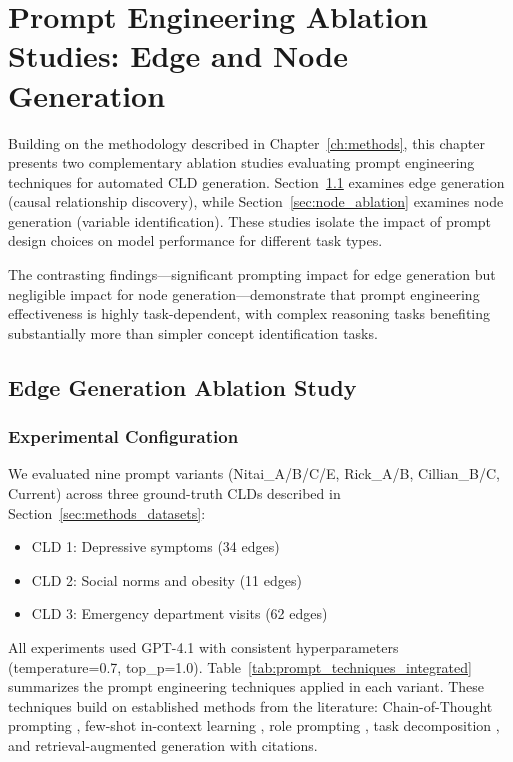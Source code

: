 \chapter{Prompt Engineering Ablation Studies: Edge and Node Generation}
\label{ch:ablation_results}

Building on the methodology described in Chapter~\ref{ch:methods}, this chapter presents two complementary ablation studies evaluating prompt engineering techniques for automated CLD generation. Section~\ref{sec:edge_ablation} examines edge generation (causal relationship discovery), while Section~\ref{sec:node_ablation} examines node generation (variable identification). These studies isolate the impact of prompt design choices on model performance for different task types.

The contrasting findings—significant prompting impact for edge generation but negligible impact for node generation—demonstrate that prompt engineering effectiveness is highly task-dependent, with complex reasoning tasks benefiting substantially more than simpler concept identification tasks.

\section{Edge Generation Ablation Study}
\label{sec:edge_ablation}

\subsection{Experimental Configuration}

We evaluated nine prompt variants (Nitai\_A/B/C/E, Rick\_A/B, Cillian\_B/C, Current) across three ground-truth CLDs described in Section~\ref{sec:methods_datasets}:
\begin{itemize}
    \item CLD 1: Depressive symptoms (34 edges)
    \item CLD 2: Social norms and obesity (11 edges)
    \item CLD 3: Emergency department visits (62 edges)
\end{itemize}

All experiments used GPT-4.1 with consistent hyperparameters (temperature=0.7, top\_p=1.0). Table~\ref{tab:prompt_techniques_integrated} summarizes the prompt engineering techniques applied in each variant. These techniques build on established methods from the literature: Chain-of-Thought prompting \cite{wei2022chain}, few-shot in-context learning \cite{brown2020language}, role prompting \cite{wang2024personas}, task decomposition \cite{zhou2022least}, and retrieval-augmented generation with citations.

